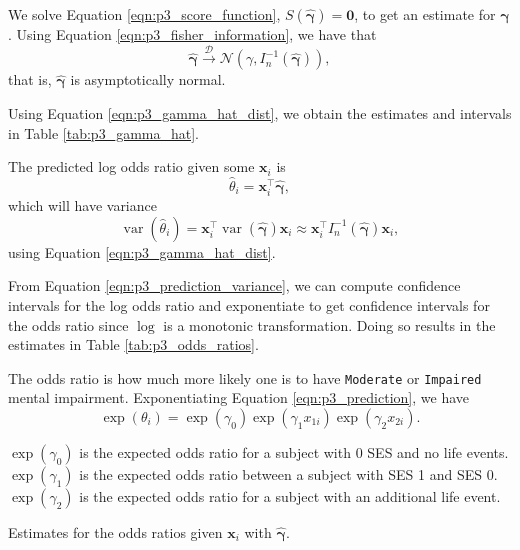 \documentclass[letterpaper,11pt]{article}
\begin{document}
\begin{enumerate}
\begin{description}
    We solve Equation \ref{eqn:p3_score_function},
    $S\left(\hat{\bm{\gamma}}\right) = \mathbf{0}$, to get an estimate for
    $\bm\gamma$. Using Equation \ref{eqn:p3_fisher_information}, we have that
    \begin{equation}
      \hat{\bm\gamma}
      \xrightarrow{\mathcal{D}}
      \mathcal{N}\left(
        \gamma,
        I_n^{-1}\left(\hat{\bm\gamma}\right)
      \right),
      \label{eqn:p3_gamma_hat_dist}
    \end{equation}
    that is, $\hat{\bm\gamma}$ is asymptotically normal.

    Using Equation \ref{eqn:p3_gamma_hat_dist}, we obtain the estimates and
    intervals in Table \ref{tab:p3_gamma_hat}.

    The predicted log odds ratio given some $\mathbf{x}_i$ is
    \begin{equation}
      \hat\theta_i = \mathbf{x}_i^\intercal\hat{\bm\gamma},
      \label{eqn:p3_prediction}
    \end{equation}
    which will have variance
    \begin{equation}
      \operatorname{var}\left(\hat\theta_i\right)
      = \mathbf{x}_i^\intercal\operatorname{var}\left(\hat{\bm\gamma}\right)
      \mathbf{x}_i
      \approx \mathbf{x}_i^\intercal I_n^{-1}\left(\hat{\bm\gamma}\right)
      \mathbf{x}_i,
      \label{eqn:p3_prediction_variance}
    \end{equation}
    using Equation \ref{eqn:p3_gamma_hat_dist}.

    From Equation \ref{eqn:p3_prediction_variance}, we can compute confidence
    intervals for the log odds ratio and exponentiate to get confidence
    intervals for the odds ratio since $\log$ is a monotonic
    transformation. Doing so results in the estimates in Table
    \ref{tab:p3_odds_ratios}.

    The odds ratio is how much more likely one is to have \texttt{Moderate} or
    \texttt{Impaired} mental impairment. Exponentiating Equation
    \ref{eqn:p3_prediction}, we have
    \begin{equation}
      \exp\left(\theta_i\right) =
      \exp\left(\gamma_0\right)
      \exp\left(\gamma_1x_{1i}\right)
      \exp\left(\gamma_2x_{2i}\right).
    \end{equation}
    
    $\exp\left(\gamma_0\right)$ is the expected odds ratio for a subject with
    $0$ SES and no life events. $\exp\left(\gamma_1\right)$ is the expected odds
    ratio between a subject with SES 1 and SES 0. $\exp\left(\gamma_2\right)$ is
    the expected odds ratio for a subject with an additional life event.
  \end{description}
  \begin{table}
    \scriptsize
    \centering
    
    \caption{Estimates for the odds ratios given $\mathbf{x}_i$ with
      $\hat{\bm\gamma}$.}
    \label{tab:p3_odds_ratios}
  \end{table}
  

\end{enumerate}
\end{document}

